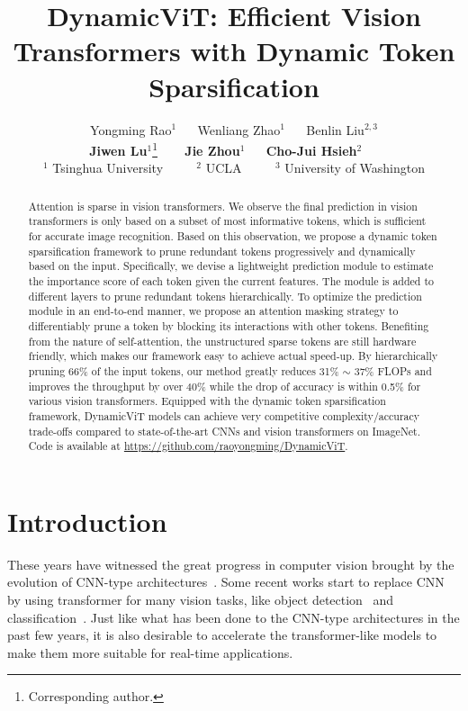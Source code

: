 \documentclass{article}
\title{DynamicViT: Efficient Vision Transformers with Dynamic Token Sparsification}
\author{
Yongming Rao$^1$ 
~~
Wenliang Zhao$^1$  
~~
Benlin Liu$^{2,3}$ \\[0.1cm]
\textbf{Jiwen Lu$^1$}\thanks{Corresponding author.}
~~~
\textbf{Jie Zhou$^1$}
~~
\textbf{Cho-Jui Hsieh$^2$} 
~~
\\ [0.25cm]
$^1$ Tsinghua University ~~~~   $^2$ UCLA ~~~~ $^3$ University of Washington
}
\begin{document}
\maketitle

\begin{abstract}
  Attention is sparse in vision transformers. We observe the final prediction in vision transformers is only based on a subset of most informative tokens, which is sufficient for accurate image recognition. Based on this observation, we propose a dynamic token sparsification framework to prune redundant tokens progressively and dynamically based on the input. Specifically, we devise a lightweight prediction module to estimate the importance score of each token given the current features. The module is added to different layers to prune redundant tokens hierarchically. To optimize the prediction module in an end-to-end manner, we propose an attention masking strategy to differentiably prune a token by blocking its interactions with other tokens. Benefiting from the nature of self-attention, the unstructured sparse tokens are still hardware friendly, which makes our framework easy to achieve actual speed-up. By hierarchically pruning 66\% of the input tokens, our method greatly reduces 31\% $\sim$ 37\%  FLOPs and improves the throughput by over 40\% while the drop of accuracy is within 0.5\% for various vision transformers. Equipped with the dynamic token sparsification framework,  DynamicViT models can achieve very competitive complexity/accuracy trade-offs compared to state-of-the-art CNNs and vision transformers on ImageNet. Code is available at \url{https://github.com/raoyongming/DynamicViT}.
\end{abstract}

\section{Introduction}

These years have witnessed the great progress in computer vision brought by the evolution of CNN-type architectures~\cite{he2016deep,krizhevsky2012alex}. Some recent works start to replace CNN by using transformer for many vision tasks, like object detection~\cite{zhu2020deformable,liu2021swin} and classification~\cite{touvron2020deit}. Just like what has been done to the CNN-type architectures in the past few years, it is also desirable to accelerate the transformer-like models to make them more suitable for real-time applications.
\end{document}
